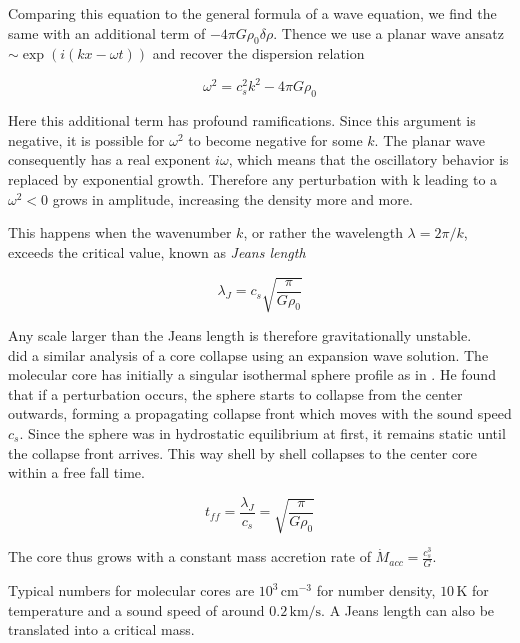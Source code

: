 Comparing this equation to the general formula of a wave equation, we find the same with an additional term of $-4\pi G\rho_{0}\delta\rho$.
Thence we use a planar wave ansatz $\sim\exp(i(kx-\omega t))$ and recover the dispersion relation

\begin{equation}
  \omega^{2} = c_{s}^{2}k^{2} - 4\pi G\rho_{0}
\end{equation}

Here this additional term has profound ramifications.
Since this argument is negative, it is possible for $\omega^{2}$ to become negative for some $k$.
The planar wave consequently has a real exponent $i\omega$, which means that the oscillatory behavior is replaced by exponential growth.
Therefore any perturbation with k leading to a $\omega^{2}<0$ grows in amplitude, increasing the density more and more.

This happens when the wavenumber $k$, or rather the wavelength $\lambda = 2\pi/k$, exceeds the critical value, known as \textit{Jeans length}

\begin{equation}
  \lambda_{J} = c_{s}\sqrt{\frac{\pi}{G\rho_{0}}}
\end{equation}

Any scale larger than the Jeans length is therefore gravitationally unstable.
\\[6pt]
%
\citet{Shu_paper} did a similar analysis of a core collapse using an expansion wave solution.
The molecular core has initially a singular isothermal sphere profile as in .
He found that if a perturbation occurs, the sphere starts to collapse from the center outwards, forming a propagating collapse front which moves with the sound speed $c_{s}$.
Since the sphere was in hydrostatic equilibrium at first, it remains static until the collapse front arrives.
This way shell by shell collapses to the center core within a free fall time.

\begin{equation}
  t_{ff} = \frac{\lambda_{J}}{c_{s}} = \sqrt{\frac{\pi}{G\rho_{0}}}
\end{equation}

The core thus grows with a constant mass accretion rate of $\dot{M}_{acc} = \frac{c_{s}^{3}}{G}$.

Typical numbers for molecular cores are $10^{3}\,\text{cm}^{-3}$ for number density, $10\,\text{K}$ for temperature and a sound speed of around $0.2\,\text{km}/\text{s}$.
A Jeans length can also be translated into a critical mass.

